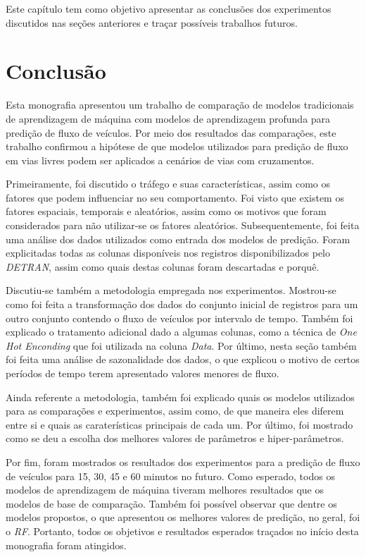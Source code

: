 Este capítulo tem como objetivo apresentar as conclusões dos experimentos discutidos nas seções anteriores e traçar possíveis trabalhos futuros.

\section{Conclusão}

Esta monografia apresentou um trabalho de comparação de modelos tradicionais de aprendizagem de máquina com modelos de aprendizagem profunda para predição de fluxo de veículos. Por meio dos resultados das comparações, este trabalho confirmou a hipótese de que modelos utilizados para predição de fluxo em vias livres podem ser aplicados a cenários de vias com cruzamentos.

Primeiramente, foi discutido o tráfego e suas características, assim como os fatores que podem influenciar no seu comportamento. Foi visto que existem os fatores espaciais, temporais e aleatórios, assim como os motivos que foram considerados para não utilizar-se os fatores aleatórios. Subsequentemente, foi feita uma análise dos dados utilizados como entrada dos modelos de predição. Foram explicitadas todas as colunas disponíveis nos registros disponibilizados pelo \textit{\acrshort{DETRAN}}, assim como quais destas colunas foram descartadas e porquê. 

Discutiu-se também a metodologia empregada nos experimentos. Mostrou-se como foi feita a transformação dos dados do conjunto inicial de registros para um outro conjunto contendo o fluxo de veículos por intervalo de tempo. Também foi explicado o tratamento adicional dado a algumas colunas, como a técnica de \textit{One Hot Enconding} que foi utilizada na coluna \textit{Data}. Por último, nesta seção também foi feita uma análise de sazonalidade dos dados, o que explicou o motivo de certos períodos de tempo terem apresentado valores menores de fluxo.

Ainda referente a metodologia, também foi explicado quais os modelos utilizados para as comparações e experimentos, assim como, de que maneira eles diferem entre si e quais as caraterísticas principais de cada um. Por último, foi mostrado como se deu a escolha dos melhores valores de parâmetros e hiper-parâmetros.

Por fim, foram mostrados os resultados dos experimentos para a predição de fluxo de veículos para 15, 30, 45 e 60 minutos no futuro. Como esperado, todos os modelos de aprendizagem de máquina tiveram melhores resultados que os modelos de base de comparação. Também foi possível observar que dentre os modelos propostos, o que apresentou os melhores valores de predição, no geral, foi o \textit{\acrshort{RF}}. Portanto, todos os objetivos e resultados esperados traçados no início desta monografia foram atingidos.


